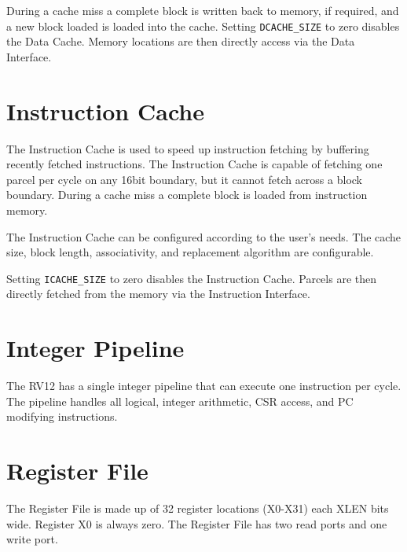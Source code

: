 During a cache miss a complete block is written back to memory, if
required, and a new block loaded is loaded into the cache. Setting 
\texttt{DCACHE\_SIZE} to zero disables the Data Cache. Memory locations
are then directly access via the Data Interface.

\section{Instruction Cache}\label{instruction-cache}

The Instruction Cache is used to speed up instruction fetching by
buffering recently fetched instructions. The Instruction Cache is
capable of fetching one parcel per cycle on any 16bit boundary, but it
cannot fetch across a block boundary. During a cache miss a complete
block is loaded from instruction memory.

The Instruction Cache can be configured according to the user's needs.
The cache size, block length, associativity, and replacement algorithm
are configurable.

Setting \texttt{ICACHE\_SIZE} to zero disables the Instruction Cache. Parcels are
then directly fetched from the memory via the Instruction Interface.

\section{Integer Pipeline}\label{integer-pipeline}

The RV12 has a single integer pipeline that can execute one instruction per cycle.
The pipeline handles all logical, integer arithmetic, CSR access, and PC
modifying instructions.


\section{Register File}\label{register-file}

The Register File is made up of 32 register locations (X0-X31) each XLEN
bits wide. Register X0 is always zero. The Register File has two read
ports and one write port.
